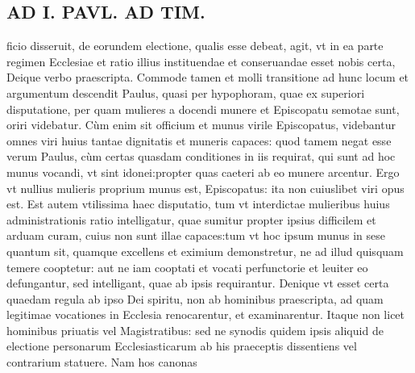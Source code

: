 \documentclass{article}
\begin{document}
\begin{pages}
\section*{AD I. PAVL. AD TIM. }
\marginpar{[ p.92 ]}\pstart ficio disseruit, de eorundem electione, qualis esse debeat, agit, vt in ea parte regimen Ecclesiae et ratio illius instituendae et conseruandae esset nobis certa, Deique verbo praescripta. Commode tamen et molli transitione ad hunc locum et argumentum descendit Paulus, quasi per hypophoram, quae ex superiori disputatione, per quam mulieres a docendi munere et Episcopatu semotae sunt, oriri videbatur. Cùm enim sit officium et munus virile Episcopatus, videbantur omnes viri huius tantae dignitatis et muneris capaces: quod tamem negat esse verum Paulus, cùm certas quasdam conditiones in iis requirat, qui sunt ad hoc munus vocandi, vt sint idonei:propter quas caeteri ab eo munere arcentur. Ergo vt nullius mulieris proprium munus est, Episcopatus: ita non cuiuslibet viri opus est. Est autem vtilissima haec disputatio, tum vt interdictae mulieribus huius administrationis ratio intelligatur, quae sumitur propter ipsius difficilem et arduam curam, cuius non sunt illae capaces:tum vt hoc ipsum munus in sese quantum sit, quamque excellens et eximium demonstretur, ne ad illud quisquam temere cooptetur: aut ne iam cooptati et vocati perfunctorie et leuiter eo defungantur, sed intelligant, quae ab ipsis requirantur. Denique vt esset certa quaedam regula ab ipso Dei spiritu, non ab hominibus praescripta, ad quam legitimae vocationes in Ecclesia renocarentur, et examinarentur. Itaque non licet hominibus priuatis vel Magistratibus: sed ne synodis quidem ipsis aliquid de electione personarum Ecclesiasticarum ab his praeceptis dissentiens vel contrarium statuere. Nam hos canonas  \pend

\end{pages}
\end{document}
